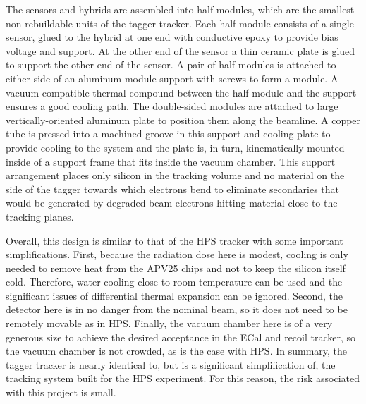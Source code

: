 The sensors and hybrids are assembled into half-modules, which are the smallest non-rebuildable units of the tagger tracker.  Each half module consists of a single sensor, glued to the hybrid at one end with conductive epoxy to provide bias voltage and support.  At the other end of the sensor a thin ceramic plate is glued to support the other end of the sensor.  A pair of half modules is attached to either side of an aluminum module support with screws to form a module.  A vacuum compatible thermal compound between the half-module and the support ensures a good cooling path.  The double-sided modules are attached to large vertically-oriented aluminum plate to position them along the beamline.  A copper tube is pressed into a machined groove in this support and cooling plate to provide cooling to the system and the plate is, in turn, kinematically mounted inside of a support frame that fits inside the vacuum chamber.  This support arrangement places only silicon in the tracking volume and no material on the side of the tagger towards which electrons bend to eliminate secondaries that would be generated by degraded beam electrons hitting material close to the tracking planes.  

Overall, this design is similar to that of the HPS tracker with some important simplifications.  First, because the radiation dose here is modest, cooling is only needed to remove heat from the APV25 chips and not to keep the silicon itself cold.  Therefore, water cooling close to room temperature can be used and the significant issues of differential thermal expansion can be ignored.  Second, the detector here is in no danger from the nominal beam, so it does not need to be remotely movable as in HPS.  Finally, the vacuum chamber here is of a very generous size to achieve the desired acceptance in the ECal and recoil tracker, so the vacuum chamber is not crowded, as is the case with HPS.  In summary, the tagger tracker is nearly identical to, but is a significant simplification of, the tracking system built for the HPS experiment.  For this reason, the risk associated with this project is small.



